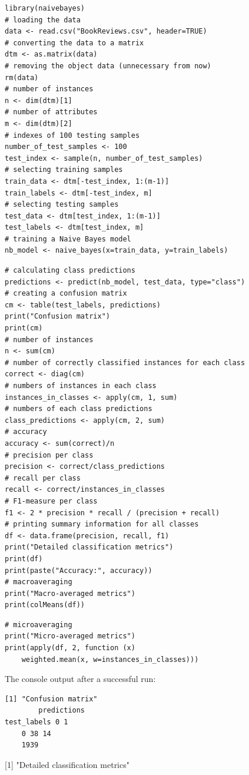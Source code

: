 \documentclass[11pt,openany,executivepaper]{book}
\begin{document}
\begin{verbatim}
library(naivebayes)
# loading the data
data <- read.csv("BookReviews.csv", header=TRUE)
# converting the data to a matrix
dtm <- as.matrix(data)
# removing the object data (unnecessary from now)
rm(data)
# number of instances
n <- dim(dtm)[1]
# number of attributes
m <- dim(dtm)[2]
# indexes of 100 testing samples
number_of_test_samples <- 100
test_index <- sample(n, number_of_test_samples)
# selecting training samples
train_data <- dtm[-test_index, 1:(m-1)]
train_labels <- dtm[-test_index, m]
# selecting testing samples
test_data <- dtm[test_index, 1:(m-1)]
test_labels <- dtm[test_index, m]
# training a Naive Bayes model
nb_model <- naive_bayes(x=train_data, y=train_labels)
\end{verbatim}

\begin{verbatim}
# calculating class predictions
predictions <- predict(nb_model, test_data, type="class")
# creating a confusion matrix
cm <- table(test_labels, predictions)
print("Confusion matrix")
print(cm)
# number of instances
n <- sum(cm)
# number of correctly classified instances for each class
correct <- diag(cm)
# numbers of instances in each class
instances_in_classes <- apply(cm, 1, sum)
# numbers of each class predictions
class_predictions <- apply(cm, 2, sum)
# accuracy
accuracy <- sum(correct)/n
# precision per class
precision <- correct/class_predictions
# recall per class
recall <- correct/instances_in_classes
# F1-measure per class
f1 <- 2 * precision * recall / (precision + recall)
# printing summary information for all classes
df <- data.frame(precision, recall, f1)
print("Detailed classification metrics")
print(df)
print(paste("Accuracy:", accuracy))
# macroaveraging
print("Macro-averaged metrics")
print(colMeans(df))
\end{verbatim}

\begin{verbatim}
# microaveraging
print("Micro-averaged metrics")
print(apply(df, 2, function (x)
    weighted.mean(x, w=instances_in_classes)))
\end{verbatim}

The console output after a successful run:

\begin{verbatim}
[1] "Confusion matrix"
        predictions
test_labels 0 1
    0 38 14
    1939
\end{verbatim}

[1] "Detailed classification metrics"
\end{document}
